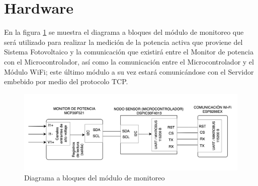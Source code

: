 \section{Hardware}
En la figura \ref{fig:circuito} se muestra el diagrama a bloques del módulo de monitoreo que será utilizado para realizar la medición de la potencia activa que proviene del Sistema Fotovoltaico y la comunicación que existirá entre el Monitor de potencia con el Microcontrolador, así como la comunicación entre el Microcontrolador y el Módulo WiFi; este último módulo a su vez estará comunicándose con el Servidor embebido por medio del protocolo TCP.  
\\
\begin{figure}[H]
	\centering
	\includegraphics[width=1\textwidth]{Capitulo4/hardware/images/sistemaDigital.png}
	\caption{Diagrama a bloques del módulo de monitoreo}
	\label{fig:circuito}
\end{figure}

%
